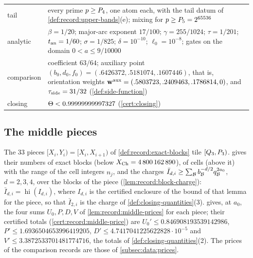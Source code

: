 {\begin{longtable}{@{}p{}p{}@{}}
tail & every prime $p\ge P_4$, one atom each, with the tail datum of \cref{def:record:upper-bands}(e); mixing for $p\ge P_5=2^{65536}$\\
analytic & $\beta=1/20$; major-arc exponent $17/100$; $\gamma=255/1024$; $\tau=1/201$; $t_{\rm an}=1/60$; $\sigma=1/825$; $\delta=10^{-10}$; $\ell_0=10^{-8}$; gates on the domain $0<a\le9/10000$\\
comparison & coefficient $63/64$; auxiliary point $(b_0,d_0,f_0)=(.6426372,.5181074,.1607446)$, that is, orientation weights $\mathbf w^{\rm aux}=(.5803723,.2409463,.1786814,0)$, and $\tau_{\mathrm{side}}=31/32$ (\cref{def:side-function})\\
closing & $\Theta<0.99999999997327$ (\cref{cert:closing})\\
\bottomrule
\end{longtable}
}

\subsection{The middle pieces}\label{subsec:data:pieces}

The $33$ pieces $[X_i,Y_i)=[X_i,X_{i+1})$ of \cref{def:record:exact-blocks}
tile $[Q_3,P_3)$.  gives their numbers of
exact blocks (below $X_{\rm Ch}=4\,800\,162\,890$), of cells (above it) with the
range of the cell integers $n_j$, and the charges
$\bar I_{d,i}\ge\sum_{\mathcal B}b_{\mathcal B}^{-d/2}q_{\mathcal B}^{2a_0}$, $d=2,3,4$, over the
blocks of the piece (\cref{lem:record:block-charge}): $\bar I_{d,i}=
\operatorname{hi}(I_{d,i})$, where $I_{d,i}$ is the certified enclosure of the
bound of that lemma for the piece, so that $\bar I_{2,i}$ is the charge of
\cref{def:closing-quantities}(3).  gives, at
$a_0$, the four sums $U_0,P,D,V$ of \cref{lem:record:middle-prices} for each
piece; their certified totals (\cref{cert:record:middle-price}) are
$U_0'\le0.846908193539142986$, $P'\le1.6936504653996419205$, $D'\le4.7417041225622828\cdot10^{-5}$ and
$V'\le3.3872533701481774716$, the totals of \cref{def:closing-quantities}(2). The
prices of the comparison records are those of \cref{subsec:data:prices}.

